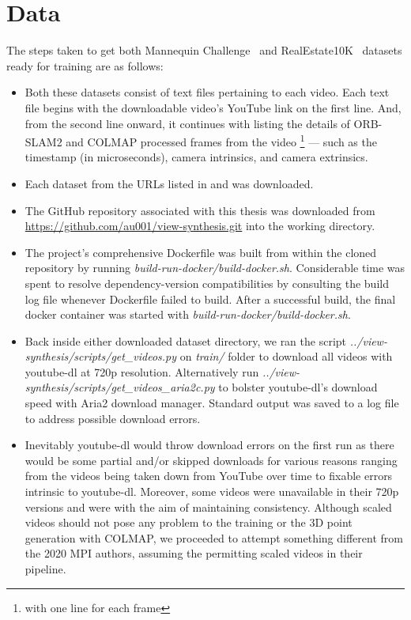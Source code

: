 \section{Data}\label{sec:data} 

The steps taken to get both Mannequin Challenge~\cite{li2019learning} and RealEstate10K~\cite{zhou2018stereo} datasets ready for training are as follows:

\begin{itemize}

    \item Both these datasets consist of text files pertaining to each video. Each text file begins with the downloadable video’s YouTube link on the first line. And, from the second line onward, it continues with listing the details of ORB-SLAM2 and COLMAP processed frames from the video \footnote{with one line for each frame} --- such as the timestamp (in microseconds), camera intrinsics, and camera extrinsics.
    
    \item Each dataset from the URLs listed in \cite{zhou2018stereo} and \cite{li2019learning} was downloaded. 
    
    \item The GitHub repository associated with this thesis was downloaded from \url{https://github.com/au001/view-synthesis.git} into the working directory.

    \item The project's comprehensive Dockerfile was built from within the cloned repository by running \textit{build-run-docker/build-docker.sh}. Considerable time was spent to resolve dependency-version compatibilities by consulting the build log file whenever Dockerfile failed to build. After a successful build, the final docker container was started with \textit{build-run-docker/build-docker.sh}.
    
    \item {\sloppy Back inside either downloaded dataset directory, we ran the script \textit{../view-synthesis/scripts/get\_videos.py} on \textit{train/} folder to download all videos with youtube-dl at 720p resolution. Alternatively run \textit{../view-synthesis/scripts/get\_videos\_aria2c.py} to bolster youtube-dl’s download speed with Aria2 download manager. Standard output was saved to a log file to address possible download errors.}  
    
    \item Inevitably youtube-dl would throw download errors on the first run as there would be some partial and/or skipped downloads for various reasons ranging from the videos being taken down from YouTube over time to fixable errors intrinsic to youtube-dl. Moreover, some videos were unavailable in their 720p versions and were with the aim of maintaining consistency. Although scaled videos should not pose any problem to the training or the 3D point generation with COLMAP, we proceeded to attempt something different from the 2020 MPI authors, assuming the permitting scaled videos in their pipeline.
    

\end{itemize}
